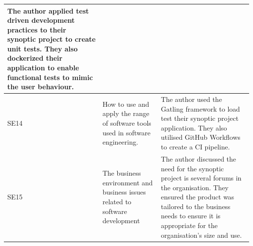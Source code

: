 \documentclass{article}
\begin{document}
\begin{landscape}
\begin{longtable}{|l|p{10cm}|p{10cm}|}
  The author applied test driven   development practices to their synoptic project to create unit tests. They   also dockerized their application to enable functional tests to mimic the   user behaviour. \\ \hline
SE14 &
  How to use and apply the range   of software tools used in software engineering. &
  The author used the Gatling   framework to load test their synoptic project application. They also utilised   GitHub Workflows to create a CI pipeline. \\ \hline
SE15 &
  The business environment and   business issues related to software development &
  The author discussed the need   for the synoptic project is several forums in the organisation. They ensured   the product was tailored to the business needs to ensure it is appropriate   for the organisation's size and use. \\ \hline
\end{longtable}
\end{landscape}
\end{document}
